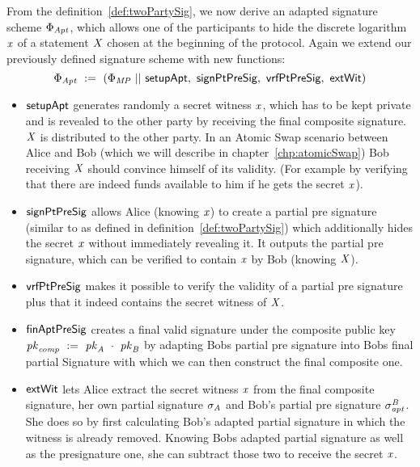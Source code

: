 \begin{definition}
    \label{def:twoPartyFixedWitAptSig}
    From the definition~\ref{def:twoPartySig}, we now derive an adapted signature scheme $\Phi_{\mathit{Apt}}$, which allows one of the participants to hide the discrete logarithm $\mathit{x}$ of a statement $\mathit{X}$ chosen
    at the beginning of the protocol. Again we extend our previously defined signature scheme with new functions:
    \[ \Phi_{\mathit{Apt}} ~:=~ (\Phi_{\mathit{MP}} ~||~ \mathsf{setupApt} ,~ \mathsf{signPtPreSig} ,~ \mathsf{vrfPtPreSig} ,~ \mathsf{extWit}) \]
    \begin{itemize}
        \item $\mathsf{setupApt}$ generates randomly a secret witness $\mathit{x}$, which has to be kept private and is revealed to the other party by receiving the final composite signature. $\mathit{X}$ is distributed
        to the other party. In an Atomic Swap scenario between Alice and Bob (which we will describe in chapter~\ref{chp:atomicSwap}) Bob receiving $\mathit{X}$ should convince himself of its validity. (For example by verifying that
        there are indeed funds available to him if he gets the secret $\mathit{x}$).
        \item $\mathsf{signPtPreSig}$ allows Alice (knowing $\mathit{x}$) to create a partial pre signature (similar to as defined in definition~\ref{def:twoPartySig}) which additionally hides the secret $\mathit{x}$ without immediately revealing it.
        It outputs the partial pre signature, which can be verified to contain $\mathit{x}$ by Bob (knowing $\mathit{X}$).
        \item $\mathsf{vrfPtPreSig}$ makes it possible to verify the validity of a partial pre signature plus that it indeed contains the secret witness of $\mathit{X}$.
        \item $\mathsf{finAptPreSig}$ creates a final valid signature under the composite public key $\mathit{pk}_{\mathit{comp}} ~:=~ \mathit{pk}_{\mathit{A}} ~\cdot~ \mathit{pk}_{\mathit{B}}$ by adapting Bobs partial pre signature
        into Bobs final partial Signature with which we can then construct the final composite one.
        \item $\mathsf{extWit}$ lets Alice extract the secret witness $\mathit{x}$ from the final composite signature, her own partial signature $\sigma_{\mathit{A}}$ and Bob's partial pre signature $\sigma^{\mathit{B}}_{\mathit{apt}}$. She does
        so by first calculating Bob's adapted partial signature in which the witness is already removed. Knowing Bobs adapted partial signature as well as the presignature one, she
        can subtract those two to receive the secret $\mathit{x}$.
    \end{itemize}
\end{definition}

